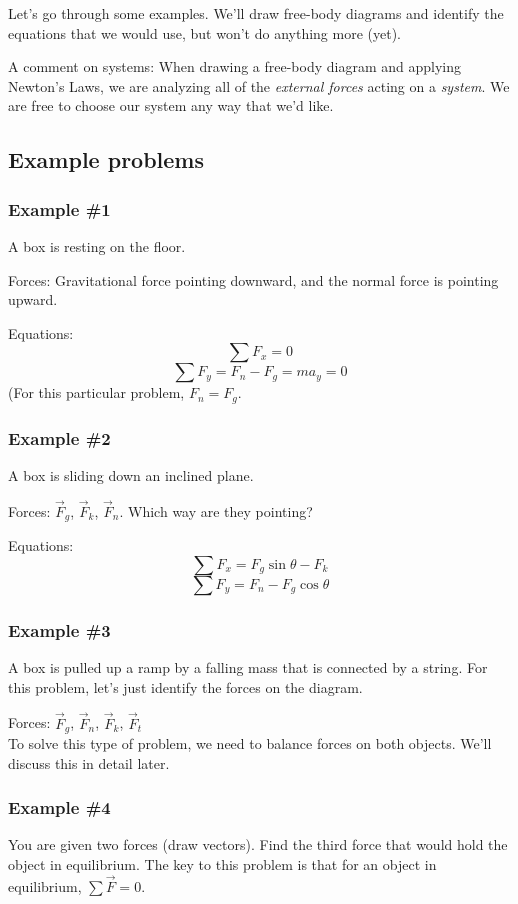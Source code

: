 Let's go through some examples. We'll draw free-body diagrams and identify the equations that we would use, but won't do anything more (yet).

A comment on systems: When drawing a free-body diagram and applying Newton's Laws, we are analyzing all of the \textit{external forces} acting on a \textit{system}. We are free to choose our system any way that we'd like.

\subsection{Example problems}
\subsubsection{Example \#1}
A box is resting on the floor.

Forces: Gravitational force pointing downward, and the normal force is pointing upward.

Equations:
$$\sum F_x=0$$
$$\sum F_y=F_n-F_g=ma_y=0$$
(For this particular problem, $F_n=F_g$.

\subsubsection{Example \#2}
A box is sliding down an inclined plane.

Forces: $\vec{F}_g$, $\vec{F}_k$, $\vec{F}_n$. Which way are they pointing?

Equations:
$$\sum F_x=F_g\sin\theta-F_k$$
$$\sum F_y=F_n-F_g\cos\theta$$

\subsubsection{Example \#3}
A box is pulled up a ramp by a falling mass that is connected by a string. For this problem, let's just identify the forces on the diagram.

Forces: $\vec{F}_g$, $\vec{F}_n$, $\vec{F}_k$, $\vec{F}_t$\\
To solve this type of problem, we need to balance forces on both objects. We'll discuss this in detail later. 

\subsubsection{Example \#4}
You are given two forces (draw vectors). Find the third force that would hold the object in equilibrium. The key to this problem is that for an object in equilibrium, $\sum \vec F=0$.


\clearpage
